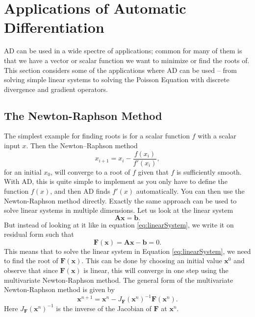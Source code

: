 \section{Applications of Automatic Differentiation}
\label{sec:ApplicationsAD}
AD can be used in a wide spectre of applications; common for many of them is that we have a vector or scalar function we want to minimize or find the roots of. This section considers some of the applications where AD can be used -- from solving simple linear systems to solving the Poisson Equation with discrete divergence and gradient operators.

\subsection{The Newton-Raphson Method}
The simplest example for finding roots is for a scalar function $f$ with a scalar input $x$. Then the Newton--Raphson method
\begin{equation*}
    x_{i+1} = x_i - \frac{f(x_i)}{f'(x_i)},
\end{equation*}
for an initial $x_0$, will converge to a root of $f$ given that $f$ is sufficiently smooth. With AD, this is quite simple to implement as you only have to define the function $f(x)$, and then AD finds $f'(x)$ automatically. You can then use the Newton-Raphson method directly. Exactly the same approach can be used to solve linear systems in multiple dimensions. Let us look at the linear system 
\begin{equation}
    \textbf{A}\boldsymbol{x} = \textbf{b}.
    \label{eq:linearSystem}
\end{equation}
But instead of looking at it like in equation \eqref{eq:linearSystem}, we write it on residual form such that
\begin{equation*}
	\boldsymbol{F}(\boldsymbol{x}) = \textbf{A}\boldsymbol{x} - \boldsymbol{b} = 0 .
\end{equation*}
This means that to solve the linear system in Equation \eqref{eq:linearSystem}, we need to find the root of $\boldsymbol{F}(\boldsymbol{x})$. This can be done by choosing an initial value $\boldsymbol{x}^0$ and observe that since $\boldsymbol{F}(\boldsymbol{x})$ is linear, this will converge in one step using the multivariate Newton-Raphson method. The general form of the multivariate Newton-Raphson method is given by
\begin{equation}
	\boldsymbol{x}^{n+1} = \boldsymbol{x}^n - J_{\boldsymbol{F}}  (\boldsymbol{x}^n)^{-1} \boldsymbol{F}(\boldsymbol{x}^n).
    \label{eq:newtonRaphsonVector}
\end{equation}
Here $J_{\boldsymbol{F}}  (\boldsymbol{x}^n)^{-1}$ is the inverse of the Jacobian of $\boldsymbol{F}$ at $\boldsymbol{x}^n$. 

